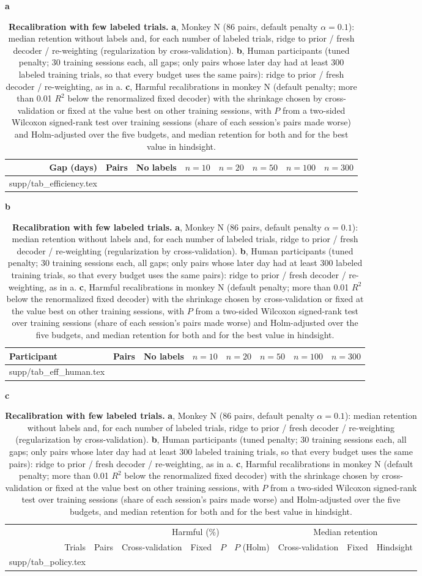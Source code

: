 \documentclass[pdflatex,sn-nature]{sn-jnl}
\makeatletter
\newcommand\tabinput[1]{\@@input #1 }
\makeatother
\begin{document}
\begin{landscape}
\begin{table}[p]
\caption{\textbf{Recalibration with few labeled trials.} \textbf{a}, Monkey N (86 pairs, default penalty
$\alpha = 0.1$): median retention without labels and, for each number of labeled trials, ridge to prior / fresh
decoder / re-weighting (regularization by cross-validation). \textbf{b}, Human participants (tuned penalty; 30
training sessions each, all gaps; only pairs whose later day had at least 300 labeled training trials, so that every
budget uses the same pairs): ridge to prior / fresh decoder / re-weighting, as in a. \textbf{c}, Harmful recalibrations in
monkey N (default penalty; more than 0.01 $R^2$ below the renormalized fixed decoder) with the shrinkage chosen by cross-validation or fixed at the value best on other training sessions, with
$P$ from a two-sided Wilcoxon signed-rank test over training sessions (share of each session's pairs made worse) and
Holm-adjusted over the five budgets, and median retention for both and for the best value in hindsight.}
\label{tab:recal}
\fontsize{6.6}{7.6}\selectfont\setlength{\tabcolsep}{3.5pt}
\textbf{a}\\[2pt]
\begin{tabular}{@{}rrrlllll@{}}
\toprule
Gap (days) & Pairs & No labels & $n = 10$ & $n = 20$ & $n = 50$ & $n = 100$ & $n = 300$ \\
\midrule
\tabinput{supp/tab_efficiency.tex}
\botrule
\end{tabular}

\vspace{6pt}
\textbf{b}\\[2pt]
\begin{tabular}{@{}lrrlllll@{}}
\toprule
Participant & Pairs & No labels & $n = 10$ & $n = 20$ & $n = 50$ & $n = 100$ & $n = 300$ \\
\midrule
\tabinput{supp/tab_eff_human.tex}
\botrule
\end{tabular}

\vspace{6pt}
\textbf{c}\\[2pt]
\begin{tabular}{@{}rrrrrrrrr@{}}
\toprule
& & \multicolumn{4}{c}{Harmful (\%)} & \multicolumn{3}{c}{Median retention} \\
\cmidrule{3-6}\cmidrule{7-9}
Trials & Pairs & Cross-validation & Fixed & $P$ & $P$ (Holm) & Cross-validation & Fixed & Hindsight \\
\midrule
\tabinput{supp/tab_policy.tex}
\botrule
\end{tabular}
\end{table}
\end{landscape}
\end{document}
